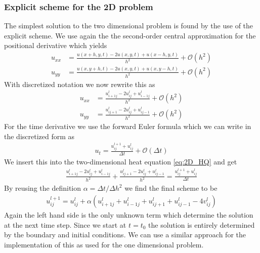 \documentclass[%
 reprint,
nofootinbib,
aps,
]{revtex4-1}
\begin{document}
\subsubsection{Explicit scheme for the 2D problem}
The simplest solution to the two dimensional problem is found by the use of the explicit scheme. We use again the the second-order central approximation for the positional derivative which yields
\begin{align*}
     u_{xx} &= \frac{u(x + h,y, t) - 2u(x,y,t) + u(x -h,y,t)}{h^2} + \mathcal{O}(h^2) \\
     u_{yy} &= \frac{u(x,y+h, t) - 2u(x,y,t) + u(x,y-h,t)}{h^2} + \mathcal{O}(h^2)
\end{align*}
With discretized notation we now rewrite this as
\begin{align*}
    u_{xx} &= \frac{u_{i+1j}^l - 2u_{ij}^l + u_{i-1j}^l}{h^2} + \mathcal{O}(h^2)\\
    u_{yy} &=  \frac{u_{ij+1}^l - 2u_{ij}^l + u_{ij-1}^l}{h^2} + \mathcal{O}(h^2)
\end{align*}
For the time derivative we use the forward Euler formula which we can write in the discretized form as
\begin{align*}
    u_t = \frac{u_{ij}^{l+1} + u_{ij}^l}{\Delta t} + \mathcal{O}(\Delta t)
\end{align*}
We insert this into the two-dimensional heat equation \ref{eq:2D_HQ} and get
\begin{align*}
    \frac{u_{i+1j}^l - 2u_{ij}^l + u_{i-1j}^l}{h^2} + \frac{u_{ij+1}^l - 2u_{ij}^l + u_{ij-1}^l}{h^2} = \frac{u_{ij}^{l+1} + u_{ij}^l}{\Delta t}
\end{align*}
By reusing the definition $\alpha = \Delta t / \Delta h^2$ we find the final scheme to be
\begin{align} \label{eq:2D_explicit}
    u_{ij}^{l+1} = u_{ij}^l + \alpha(u_{i+1j}^l + u_{i-1j}^l + u_{ij+1}^l + u_{ij-1}^l -4v_{ij}^l)
\end{align}
Again the left hand side is the only unknown term which determine the solution at the next time step. Since we start at $t = t_0$ the solution is entirely determined by the boundary and initial conditions. We can use a similar approach for the implementation of this as used for the one dimensional problem.
\end{document}
